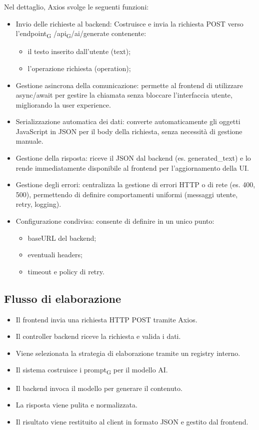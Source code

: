 \documentclass[11pt,a4paper]{article}
\newcommand{\gls}[1]{#1\textsubscript{G}}
\begin{document}
Nel dettaglio, Axios svolge le seguenti funzioni:
\begin{itemize}
\item Invio delle richieste al backend:
Costruisce e invia la richiesta POST verso l’\gls{endpoint} /\gls{api}/ai/generate contenente:
\begin{itemize}
\item il testo inserito dall’utente (text);
\item l’operazione richiesta (operation);
\end{itemize}

\item Gestione asincrona della comunicazione: permette al frontend di utilizzare async/await per gestire la chiamata senza bloccare l’interfaccia utente, migliorando la user experience.
\item Serializzazione automatica dei dati: converte automaticamente gli oggetti JavaScript in JSON per il body della richiesta, senza necessità di gestione manuale.
\item Gestione della risposta: riceve il JSON dal backend (es. generated\_text) e lo rende immediatamente disponibile al frontend per l’aggiornamento della UI.
\item Gestione degli errori: centralizza la gestione di errori HTTP o di rete (es. 400, 500), permettendo di definire comportamenti uniformi (messaggi utente, retry, logging).
\item Configurazione condivisa: consente di definire in un unico punto:
\begin{itemize}
\item baseURL del backend;
\item eventuali headers;
\item timeout e policy di retry.
\end{itemize}
\end{itemize}

\subsection{Flusso di elaborazione}
\begin{itemize}
\item Il frontend invia una richiesta HTTP POST tramite Axios.
\item Il controller backend riceve la richiesta e valida i dati.
\item Viene selezionata la strategia di elaborazione tramite un registry interno.
\item Il sistema costruisce i \gls{prompt} per il modello AI.
\item Il backend invoca il modello per generare il contenuto.
\item La risposta viene pulita e normalizzata.
\item Il risultato viene restituito al client in formato JSON e gestito dal frontend.
\end{itemize}
\end{document}
